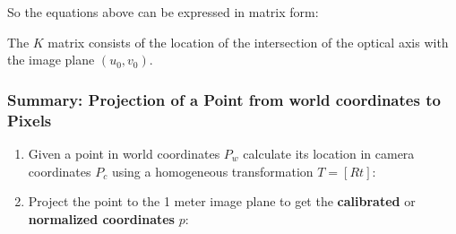 \documentclass[10pt,a4paper]{scrartcl}
\begin{document}
\begin{multicols*}{2}
So the equations above can be expressed in matrix form:


The $K$ matrix consists of the location of the intersection of the optical axis with the image plane $(u_0,v_0)$.

\subsubsection{Summary: Projection of a Point from world coordinates to Pixels}

\begin{enumerate}
\item Given a point in world coordinates $P_w$ calculate its location in camera coordinates $P_c$ using a homogeneous transformation $T=[R t]$:

\item Project the point to the 1 meter image plane to get the \textbf{calibrated} or \textbf{normalized coordinates} $p$:


\end{enumerate}
\end{multicols*}
\end{document}
